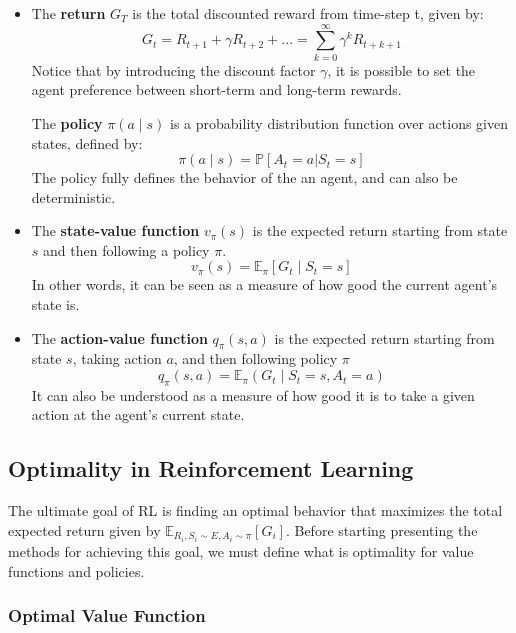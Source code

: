 \begin{itemize}
\item
	The \textbf{return} $G_T$ is the total discounted reward from time-step t, given by:
	\begin{equation}
	G_t = R_{t+1} + \gamma R_{t+2} + ... = \sum_{k=0}^{\infty}{\gamma^k R_{t+k+1}}
	\end{equation}
	Notice that by introducing the discount factor $\gamma$, it is possible to set the agent preference between short-term and long-term rewards.

	The \textbf{policy} $\pi(a \mid s)$ is a probability distribution function over actions given states, defined by:
	\begin{equation}
	\pi(a \mid s) = \mathbb{P}[A_t=a | S_t=s]
	\end{equation}
	The policy fully defines the behavior of the an agent, and can also be deterministic.
\item
	The \textbf{state-value function} $v_{\pi}(s)$ is the expected return starting from state $s$ and then following a policy $\pi$.
	\begin{equation}
	v_{\pi}(s) = \mathbb{E}_{\pi}[G_t \mid S_t = s]
	\label{eq:state_value_function_definition}
	\end{equation}
	In other words, it can be seen as a measure of how good the current agent's state is.
\item
	The \textbf{action-value function} $q_{\pi}(s,a)$ is the expected return starting from state $s$, taking action $a$, and then following policy $\pi$
	\begin{equation}
	q_{\pi}(s,a) = \mathbb{E}_{\pi}(G_t \mid S_t = s, A_t = a)
	\label{eq:action_value_function_definition}
	\end{equation}
	It can also be understood as a measure of how good it is to take a given action at the agent's current state.
\end{itemize}

\subsection{Optimality in Reinforcement Learning}

The ultimate goal of RL is finding an optimal behavior that maximizes the total expected return given by $\mathbb{E}_{R_i,S_i \sim E, A_i \sim \pi}[G_i]$. Before starting presenting the methods for achieving this goal, we must define what is optimality for value functions and policies.

\subsubsection{Optimal Value Function}

